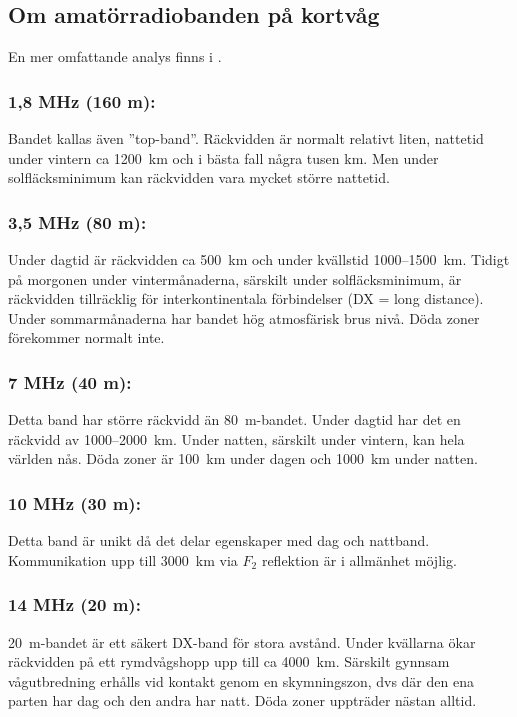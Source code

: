 \subsection{Om amatörradiobanden på kortvåg}

En mer omfattande analys finns i \cite{ARRLHDB2015}.

\subsubsection{1,8 MHz (160 m):}

Bandet kallas även ''top-band''. Räckvidden är normalt relativt liten,
nattetid under vintern ca 1200~km och i bästa fall några tusen km.
Men under solfläcksminimum kan räckvidden vara mycket större nattetid.

\subsubsection{3,5 MHz (80 m):}

Under dagtid är räckvidden ca 500~km och under kvällstid 1000--1500~km.
Tidigt på morgonen under vintermånaderna, särskilt under
solfläcksminimum, är räckvidden tillräcklig för interkontinentala
förbindelser (DX = long distance). Under sommarmånaderna har bandet
hög atmosfärisk brus nivå. Döda zoner förekommer normalt inte.

\subsubsection{7 MHz (40 m):}

Detta band har större räckvidd än 80~m-bandet. Under dagtid har det en
räckvidd av 1000--2000~km. Under natten, särskilt under vintern, kan
hela världen nås. Döda zoner är 100~km under dagen och 1000~km under
natten.

\subsubsection{10 MHz (30 m):}

Detta band är unikt då det delar egenskaper med dag och nattband.
Kommunikation upp till 3000~km via \(F_2\) reflektion är i allmänhet möjlig.
\subsubsection{14 MHz (20 m):}

20~m-bandet är ett säkert DX-band för stora avstånd.
Under kvällarna ökar räckvidden på ett rymdvågshopp upp till ca 4000~km.
Särskilt gynnsam vågutbredning erhålls vid kontakt genom en skymningszon, dvs
där den ena parten har dag och den andra har natt.
Döda zoner uppträder nästan alltid.

